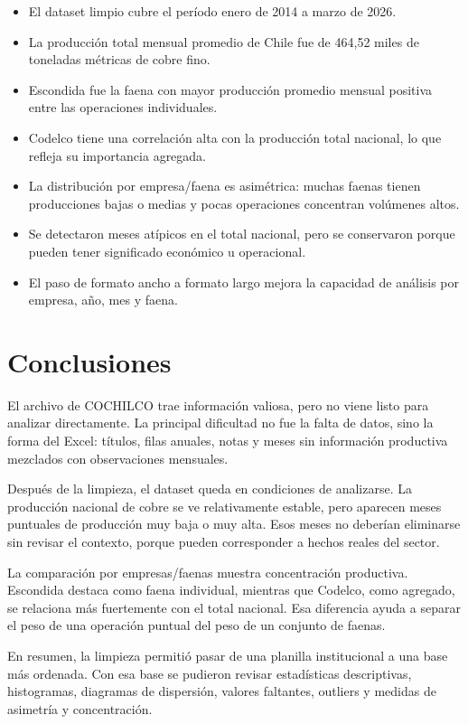 \documentclass[11pt,letterpaper]{article}
\begin{document}
\begin{itemize}[itemsep=0.25em]
    \item El dataset limpio cubre el período enero de 2014 a marzo de 2026.
    \item La producción total mensual promedio de Chile fue de 464,52 miles de toneladas métricas de cobre fino.
    \item Escondida fue la faena con mayor producción promedio mensual positiva entre las operaciones individuales.
    \item Codelco tiene una correlación alta con la producción total nacional, lo que refleja su importancia agregada.
    \item La distribución por empresa/faena es asimétrica: muchas faenas tienen producciones bajas o medias y pocas operaciones concentran volúmenes altos.
    \item Se detectaron meses atípicos en el total nacional, pero se conservaron porque pueden tener significado económico u operacional.
    \item El paso de formato ancho a formato largo mejora la capacidad de análisis por empresa, año, mes y faena.
\end{itemize}

\section{Conclusiones}

El archivo de COCHILCO trae información valiosa, pero no viene listo para analizar directamente. La principal dificultad no fue la falta de datos, sino la forma del Excel: títulos, filas anuales, notas y meses sin información productiva mezclados con observaciones mensuales.

Después de la limpieza, el dataset queda en condiciones de analizarse. La producción nacional de cobre se ve relativamente estable, pero aparecen meses puntuales de producción muy baja o muy alta. Esos meses no deberían eliminarse sin revisar el contexto, porque pueden corresponder a hechos reales del sector.

La comparación por empresas/faenas muestra concentración productiva. Escondida destaca como faena individual, mientras que Codelco, como agregado, se relaciona más fuertemente con el total nacional. Esa diferencia ayuda a separar el peso de una operación puntual del peso de un conjunto de faenas.

En resumen, la limpieza permitió pasar de una planilla institucional a una base más ordenada. Con esa base se pudieron revisar estadísticas descriptivas, histogramas, diagramas de dispersión, valores faltantes, outliers y medidas de asimetría y concentración.
\end{document}

